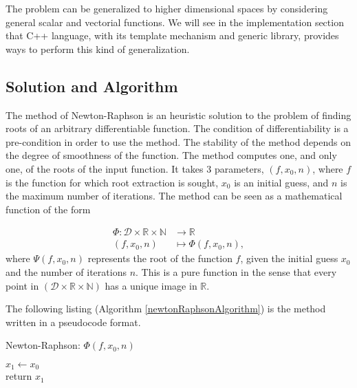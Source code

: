 \documentclass[12pt]{article}
\begin{document}
  		The problem can be generalized to higher dimensional spaces by considering general scalar and vectorial functions.  
  		We will see in the implementation section that C++ language, with its template mechanism and generic library, provides ways to perform this kind of generalization.
  
  
 	 \subsection {Solution and Algorithm}
  		The method of Newton-Raphson is an heuristic solution to the problem of finding roots of an arbitrary differentiable function. 
  		The condition of differentiability is a pre-condition in order to use the method.  The stability of the method depends on the degree of smoothness of the function.
  		The method computes one, and only one, of the roots of the input function.  
  		It takes 3 parameters, \( (f,x_0,n) \), where \(f\) is the function for which root extraction is sought, 
  		\(x_0\) is an initial guess, and \(n\) is the maximum number of iterations.  The method can be seen as a mathematical function of the form
  
  		\begin{align} \label{eq:functionalPhi}
   			\Phi \colon  \mathcal{D} \times \mathbb{R} \times \mathbb{N}  &\to \mathbb{R} \nonumber\\
   			(f,x_0,n) &\mapsto \Phi(f,x_0,n),
  		\end{align}
	  where \( \Psi (f,x_0,n)\) represents the root of the function \( f\), given the initial guess \(x_0\) and the number of iterations \(n\).  
  	This is a pure function in the sense that every point in \(  (\mathcal{D} \times \mathbb{R} \times \mathbb{N} )\) has a unique image in \( \mathbb{R} \).
  
  	The following listing (Algorithm \ref {newtonRaphsonAlgorithm}) is the method written in a pseudocode format.
  
    	\begin{algorithm}[H]
     	\caption{Newton-Raphson: $\Phi (f,x_0,n)$}
     	\label {newtonRaphsonAlgorithm}
    		$x_1 \gets x_0$ \\
    		return $x_1$
    \end{algorithm}
    
\end{document}
